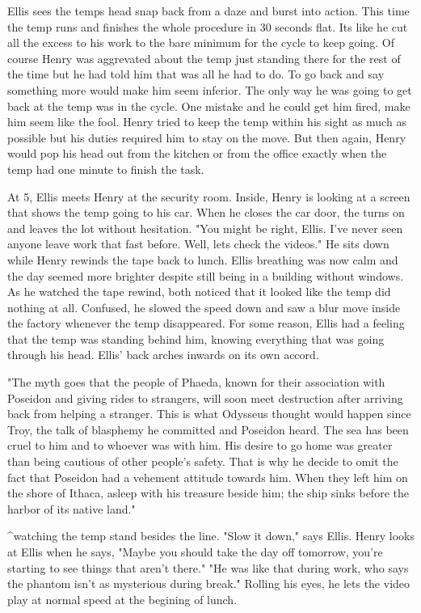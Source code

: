 \begin{Document}
        Ellis sees the temps head snap back from a daze and burst into action. This time the temp runs and finishes the whole procedure in 30 seconds flat. Its
    like he cut all the excess to his work to the bare minimum for the cycle to keep going. Of course Henry was aggrevated about the temp just standing there
    for the rest of the time but he had told him that was all he had to do. To go back and say something more would make him seem inferior. The only way he was
    going to get back at the temp was in the cycle. One mistake and he could get him fired, make him seem like the fool. Henry tried to keep the temp within his
    sight as much as possible but his duties required him to stay on the move. But then again, Henry would pop his head out from the kitchen or from the office
    exactly when the temp had one minute to finish the task.

        At 5, Ellis meets Henry at the security room. Inside, Henry is looking at a screen that shows the temp going to his car. When he closes the car door,
    the turns on and leaves the lot without hesitation. "You might be right, Ellis. I've never seen anyone leave work that fast before. Well, lets check the
    videos." He sits down while Henry rewinds the tape back to lunch. Ellis breathing was now calm and the day seemed more brighter despite still being in a
    building without windows. As he watched the tape rewind, both noticed that it looked like the temp did nothing at all. Confused, he slowed the speed down
    and saw a blur move inside the factory whenever the temp disappeared. For some reason, Ellis had a feeling that the temp was standing behind him, knowing
    everything that was going through his head. Ellis' back arches inwards on its own accord.

        "The myth goes that the people of Phaeda, known for their association with Poseidon and giving rides to strangers, will soon meet destruction after
    arriving back from helping a stranger. This is what Odysseus thought would happen since Troy, the talk of blasphemy he committed and Poseidon heard. The
    sea has been cruel to him and to whoever was with him. His desire to go home was greater than being cautious of other people's safety. That is why he decide
    to omit the fact that Poseidon had a vehement attitude towards him. When they left him on the shore of Ithaca, asleep with his treasure beside him; the ship
    sinks before the harbor of its native land."

                                  ^watching the temp stand besides the line.
        "Slow it down," says Ellis. Henry looks at Ellis when he says, "Maybe you should take the day off tomorrow, you're starting to see things that aren't
    there." "He was like that during work, who says the phantom isn't as mysterious during break." Rolling his eyes, he lets the video play at normal speed at
    the begining of lunch.
\end{Document}

